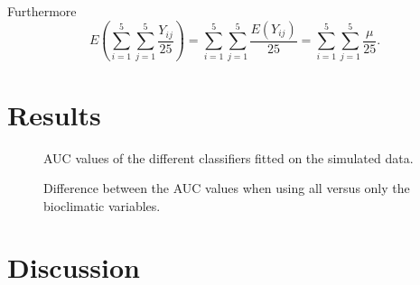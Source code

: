 Furthermore
\[E\left(\sum_{i=1}^5 \sum_{j=1}^5 \frac{Y_{ij}}{25} \right) = \sum_{i=1}^5 \sum_{j=1}^5 \frac{E(Y_{ij})}{25} = \sum_{i=1}^5 \sum_{j=1}^5 \frac{\mu}{25}.\]

\section{Results}



\begin{figure}[!htb]
\center
{}
\caption{\label{fig:PrAbAUC}AUC values of the different classifiers fitted on the simulated data.}
\end{figure}


\begin{figure}[!htb]
\center
{}
\caption{\label{fig:PrAbAUC}Difference between the AUC values when using all versus only the bioclimatic variables.}
\end{figure}

\section{Discussion}






